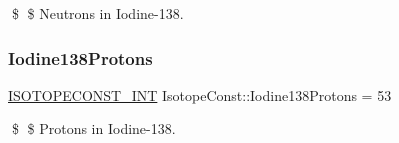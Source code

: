 \$ \$ Neutrons in Iodine-\/138. \mbox{\label{group___isotope_const-_iodine-_i138_ga1dbc44747f5ece6f8a592dbb4a6b8070}} 
\subsubsection{\texorpdfstring{Iodine138\+Protons}{Iodine138Protons}}
{\footnotesize\ttfamily \mbox{\hyperlink{group___isotope_const-_macros_ga5f18360b3e99483a35c32d789e62621c}{I\+S\+O\+T\+O\+P\+E\+C\+O\+N\+S\+T\+\_\+\+I\+NT}} Isotope\+Const\+::\+Iodine138\+Protons = 53}

\$ \$ Protons in Iodine-\/138. 